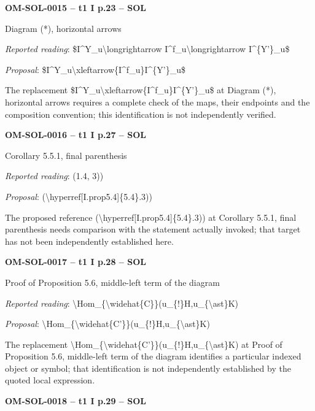 \par\noindent\textbf{OM-SOL-0015 -- t1 I p.23 -- SOL}\par
Diagram (*), horizontal arrows\par
\emph{Reported reading}: \$I\textasciicircum{}Y\_u\textbackslash{}longrightarrow I\textasciicircum{}f\_u\textbackslash{}longrightarrow I\textasciicircum{}\{Y'\}\_u\$\par
\emph{Proposal}: \$I\textasciicircum{}Y\_u\textbackslash{}xleftarrow\{I\textasciicircum{}f\_u\}I\textasciicircum{}\{Y'\}\_u\$\par
The replacement \$I\textasciicircum{}Y\_u\textbackslash{}xleftarrow\{I\textasciicircum{}f\_u\}I\textasciicircum{}\{Y'\}\_u\$ at Diagram (*), horizontal arrows requires a complete check of the maps, their endpoints and the composition convention; this identification is not independently verified.\par
\par\noindent\textbf{OM-SOL-0016 -- t1 I p.27 -- SOL}\par
Corollary 5.5.1, final parenthesis\par
\emph{Reported reading}: (1.4, 3))\par
\emph{Proposal}: (\textbackslash{}hyperref[I.prop5.4]\{5.4\}.3))\par
The proposed reference (\textbackslash{}hyperref[I.prop5.4]\{5.4\}.3)) at Corollary 5.5.1, final parenthesis needs comparison with the statement actually invoked; that target has not been independently established here.\par
\par\noindent\textbf{OM-SOL-0017 -- t1 I p.28 -- SOL}\par
Proof of Proposition 5.6, middle-left term of the diagram\par
\emph{Reported reading}: \textbackslash{}Hom\_\{\textbackslash{}widehat\{C\}\}(u\_\{!\}H,u\_\{\textbackslash{}ast\}K)\par
\emph{Proposal}: \textbackslash{}Hom\_\{\textbackslash{}widehat\{C'\}\}(u\_\{!\}H,u\_\{\textbackslash{}ast\}K)\par
The replacement \textbackslash{}Hom\_\{\textbackslash{}widehat\{C'\}\}(u\_\{!\}H,u\_\{\textbackslash{}ast\}K) at Proof of Proposition 5.6, middle-left term of the diagram identifies a particular indexed object or symbol; that identification is not independently established by the quoted local expression.\par
\par\noindent\textbf{OM-SOL-0018 -- t1 I p.29 -- SOL}\par
